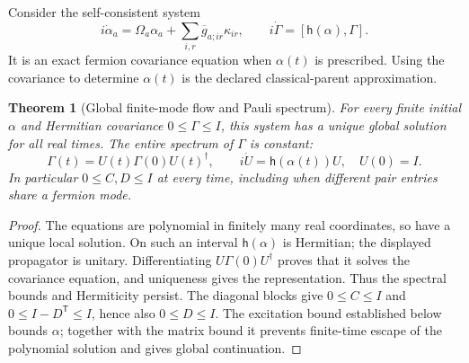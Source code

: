 \documentclass[11pt]{article}
\newtheorem{theorem}{Theorem}[section]
\theoremstyle{remark}
\begin{document}
Consider the self-consistent system
\[
 i\dot\alpha_a=\Omega_a\alpha_a+
                      \sum_{i,r}\overline g_{a;ir}\kappa_{ir},
 \qquad
 i\dot\Gamma=[\mathsf h(\alpha),\Gamma].
\]
It is an exact fermion covariance equation when
\(\alpha(t)\) is prescribed.  Using the covariance
to determine \(\alpha(t)\) is the declared classical-parent
approximation.

\begin{theorem}[Global finite-mode flow and Pauli spectrum]
\label{thm:v20v71-pauli}
For every finite initial \(\alpha\) and Hermitian
covariance \(0\leq\Gamma\leq I\), this system has a
unique global solution for all real times.
The entire spectrum of \(\Gamma\) is constant:
\[
 \Gamma(t)=U(t)\Gamma(0)U(t)^\dagger,\qquad
 i\dot U=\mathsf h(\alpha(t))U,\quad U(0)=I.
\]
In particular \(0\leq C,D\leq I\) at every time,
including when different pair entries share a
fermion mode.
\end{theorem}
\begin{proof}
The equations are polynomial in finitely many real
coordinates, so have a unique local solution.
On such an interval \(\mathsf h(\alpha)\) is Hermitian;
the displayed propagator is unitary.
Differentiating \(U\Gamma(0)U^\dagger\) proves that
it solves the covariance equation, and uniqueness
gives the representation.  Thus the spectral bounds
and Hermiticity persist.
The diagonal blocks give \(0\leq C\leq I\) and
\(0\leq I-D^{\mathsf T}\leq I\), hence also \(0\leq D\leq I\).
The excitation bound established below bounds
\(\alpha\); together with the matrix bound it prevents
finite-time escape of the polynomial solution and
gives global continuation.
\end{proof}
\end{document}
